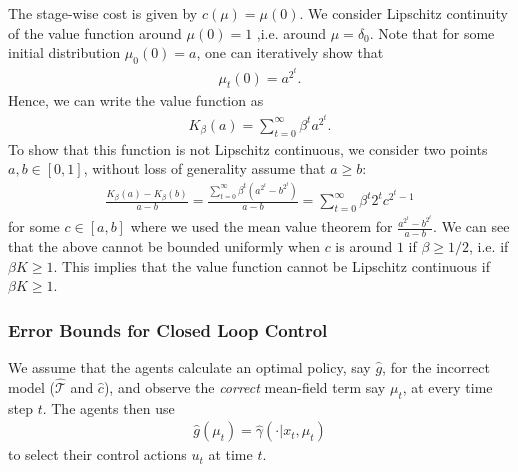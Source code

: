\documentclass[twoside,11pt]{article}
\begin{document}
\begin{example}
The stage-wise cost is given by $c(\mu)=\mu(0)$.
We consider Lipschitz continuity of the value function around $\mu(0)=1$ ,i.e. around $\mu=\delta_0$. Note that for some initial distribution $\mu_0(0)=a$, one can iteratively show that
\begin{align*}
\mu_t(0)=a^{{2^t}}.
\end{align*}
Hence, we can write the value function as 
\begin{align*}
K_\beta(a)=\sum_{t=0}^\infty \beta^t a^{{2^t}}.
\end{align*}
To show that this function is not Lipschitz continuous, we consider two points $a,b \in[0,1]$, without loss of generality assume that $a\geq b$:
\begin{align*}
\frac{K_\beta(a)-K_\beta(b)}{a-b}=\frac{\sum_{t=0}^\infty \beta^t (a^{2^t} - b^{2^t})}{a-b}=\sum_{t=0}^\infty \beta^t 2^t c^{2^t -1}
\end{align*}
for some $c\in[a,b]$ where we used the mean value theorem for $\frac{a^{2^t} - b^{2^t}}{a-b}$. We can see that the above cannot be bounded uniformly when $c$ is around $1$ if $\beta\geq 1/2$, i.e. if $\beta K \geq 1$. This implies that the value function cannot be Lipschitz continuous if $\beta K \geq 1$.
\end{example}



\subsubsection{Error Bounds for Closed Loop Control}
 We assume that the agents calculate an optimal policy, say $\hat{g}$, for the incorrect model ($\hat{\mathcal{T}}$ and $\hat{c}$), and observe the {\it correct} mean-field term say $\mu_t$, at every time step $t$. The agents then use
\begin{align}\label{closed_loop}
\hat{g}({\mu}_t) = \hat{\gamma}(\cdot|x_t,{\mu}_t)
\end{align}
to select their control actions $u_t$ at time $t$.
\end{document}
